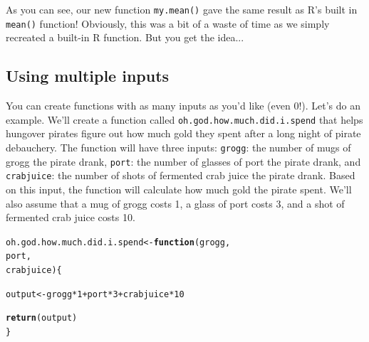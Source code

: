 \documentclass{tufte-book}\usepackage[]{graphicx}\usepackage[]{color}
\makeatletter
\newcommand{\hlnum}[1]{\textcolor[rgb]{0.686,0.059,0.569}{#1}}%
\newcommand{\hlopt}[1]{\textcolor[rgb]{0,0,0}{#1}}%
\newcommand{\hlstd}[1]{\textcolor[rgb]{0.345,0.345,0.345}{#1}}%
\newcommand{\hlkwa}[1]{\textcolor[rgb]{0.161,0.373,0.58}{\textbf{#1}}}%
\newcommand{\hlkwb}[1]{\textcolor[rgb]{0.69,0.353,0.396}{#1}}%
\newcommand{\hlkwc}[1]{\textcolor[rgb]{0.333,0.667,0.333}{#1}}%
\newcommand{\hlkwd}[1]{\textcolor[rgb]{0.737,0.353,0.396}{\textbf{#1}}}%
\newenvironment{kframe}{%
 \def\at@end@of@kframe{}%
 \ifinner\ifhmode%
  \def\at@end@of@kframe{\end{minipage}}%
  \begin{minipage}{\columnwidth}%
 \fi\fi%
 \def\FrameCommand##1{\hskip\@totalleftmargin \hskip-\fboxsep
 \colorbox{shadecolor}{##1}\hskip-\fboxsep
     \hskip-\linewidth \hskip-\@totalleftmargin \hskip\columnwidth}%
 \MakeFramed {\advance\hsize-\width
   \@totalleftmargin\z@ \linewidth\hsize
   \@setminipage}}%
 {\par\unskip\endMakeFramed%
 \at@end@of@kframe}
\newenvironment{knitrout}{}{} %
\makeatother
\begin{document}
As you can see, our new function \texttt{my.mean()} gave the same result as R's built in \texttt{mean()} function! Obviously, this was a bit of a waste of time as we simply recreated a built-in R function. But you get the idea...

\subsection{Using multiple inputs}

You can create functions with as many inputs as you'd like (even 0!). Let's do an example. We'll create a function called \texttt{oh.god.how.much.did.i.spend} that helps hungover pirates figure out how much gold they spent after a long night of pirate debauchery. The function will have three inputs: \texttt{grogg}: the number of mugs of grogg the pirate drank, \texttt{port}: the number of glasses of port the pirate drank, and \texttt{crabjuice}: the number of shots of fermented crab juice the pirate drank. Based on this input, the function will calculate how much gold the pirate spent. We'll also assume that a mug of grogg costs 1, a glass of port costs 3, and a shot of fermented crab juice costs 10.

\begin{knitrout}
\color{fgcolor}\begin{kframe}
\begin{alltt}
\hlstd{oh.god.how.much.did.i.spend} \hlkwb{<-} \hlkwa{function}\hlstd{(}\hlkwc{grogg}\hlstd{,}
                                        \hlkwc{port}\hlstd{,}
                                        \hlkwc{crabjuice}\hlstd{) \{}

  \hlstd{output} \hlkwb{<-} \hlstd{grogg} \hlopt{*} \hlnum{1} \hlopt{+} \hlstd{port} \hlopt{*} \hlnum{3} \hlopt{+} \hlstd{crabjuice} \hlopt{*} \hlnum{10}

  \hlkwd{return}\hlstd{(output)}
\hlstd{\}}
\end{alltt}
\end{kframe}
\end{knitrout}
\end{document}
